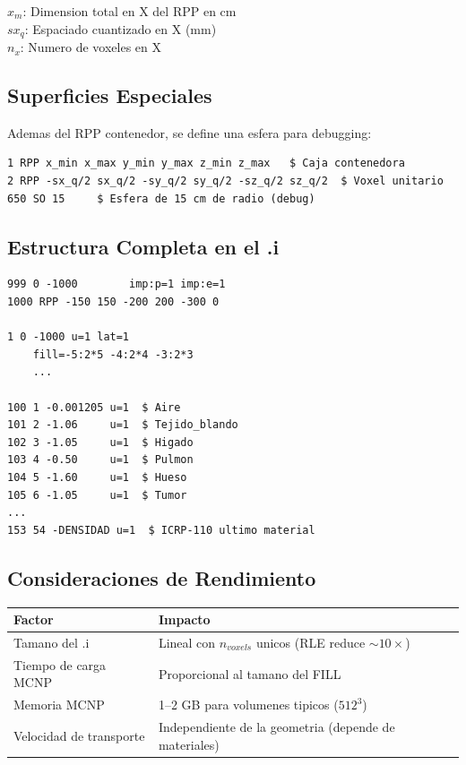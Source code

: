 \documentclass[12pt,a4paper]{article}
\newcommand{\vardef}[2]{\noindent\textbf{#1}: #2\\}
\begin{document}
\vardef{$x_m$}{Dimension total en X del RPP en cm}
\vardef{$sx_q$}{Espaciado cuantizado en X (mm)}
\vardef{$n_x$}{Numero de voxeles en X}

\subsection{Superficies Especiales}

Ademas del RPP contenedor, se define una esfera para debugging:

\begin{verbatim}
1 RPP x_min x_max y_min y_max z_min z_max   $ Caja contenedora
2 RPP -sx_q/2 sx_q/2 -sy_q/2 sy_q/2 -sz_q/2 sz_q/2  $ Voxel unitario
650 SO 15     $ Esfera de 15 cm de radio (debug)
\end{verbatim}

\subsection{Estructura Completa en el .i}

\begin{verbatim}
999 0 -1000        imp:p=1 imp:e=1
1000 RPP -150 150 -200 200 -300 0

1 0 -1000 u=1 lat=1
    fill=-5:2*5 -4:2*4 -3:2*3
    ...

100 1 -0.001205 u=1  $ Aire
101 2 -1.06     u=1  $ Tejido_blando
102 3 -1.05     u=1  $ Higado
103 4 -0.50     u=1  $ Pulmon
104 5 -1.60     u=1  $ Hueso
105 6 -1.05     u=1  $ Tumor
...
153 54 -DENSIDAD u=1  $ ICRP-110 ultimo material
\end{verbatim}

\subsection{Consideraciones de Rendimiento}

\begin{center}
\begin{tabular}{ll}
\toprule
\textbf{Factor} & \textbf{Impacto} \\
\midrule
Tamano del .i & Lineal con $n_{voxels}$ unicos (RLE reduce $\sim 10\times$) \\
Tiempo de carga MCNP & Proporcional al tamano del FILL \\
Memoria MCNP & 1--2 GB para volumenes tipicos ($512^3$) \\
Velocidad de transporte & Independiente de la geometria (depende de materiales) \\
\bottomrule
\end{tabular}
\end{center}
\end{document}
